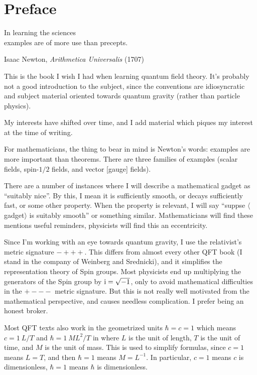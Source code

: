 \chapter*{Preface}

\epigraph{In learning the sciences\\
  examples are of more use than precepts.}%
{Isaac Newton, \textit{Arithmetica Universalis} (1707)}

\M
This is the book I wish I had when learning quantum field theory.
It's probably not a good introduction to the subject, since the
conventions are idiosyncratic and subject material oriented towards
quantum gravity (rather than particle physics).

My interests have shifted over time, and I add material which piques my
interest at the time of writing.

\M
For mathematicians, the thing to bear in mind is Newton's words:
examples are more important than theorems. There are three families of
examples (scalar fields, spin-$1/2$ fields, and vector [gauge] fields).

There are a number of instances where I will describe a mathematical
gadget as ``suitably nice''. By this, I mean it is sufficiently smooth,
or decays sufficiently fast, or some other property. When the property
is relevant, I will say ``suppse $\langle$gadget$\rangle$ is suitably smooth''
or something similar. Mathematicians will find these mentions useful
reminders, physicists will find this an eccentricity.

Since I'm working with an eye towards quantum gravity, I use the
relativist's metric signature $-+++$. This differs from almost every
other QFT book (I stand in the company of Weinberg and Srednicki), and
it simplifies the representation theory of Spin groups. Most physicists
end up multiplying the generators of the Spin group by $\mathrm{i}=\sqrt{-1}$,
only to avoid mathematical difficulties in the $+---$ metric
signature. But this is not really well motivated from the mathematical
perspective, and causes needless complication. I prefer being an honest
broker.

Most QFT texts also work in the geometrized units $\hbar=c=1$ which
means $c=1~L/T$ and $\hbar=1~ML^{2}/T$ in where $L$ is the unit of
length, $T$ is the unit of time, and $M$ is the unit of mass. This is
used to simplify formulas, since $c=1$ means $L=T$, and then $\hbar=1$
means $M=L^{-1}$. In particular, $c=1$ means $c$ is dimensionless,
$\hbar=1$ means $\hbar$ is dimensionless.

